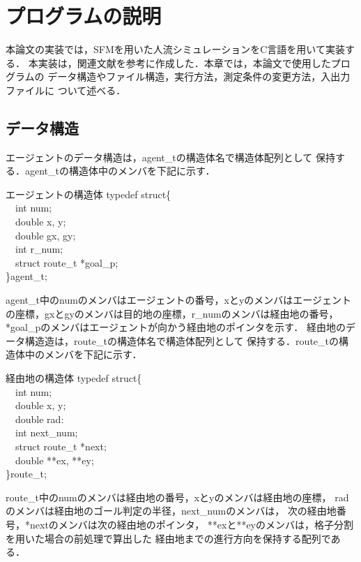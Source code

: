 \chapter{プログラムの説明}
\label{sec:appendix}
本論文の実装では，SFMを用いた人流シミュレーションをC言語を用いて実装する．
本実装は，関連文献を参考に作成した．本章では，本論文で使用したプログラムの
データ構造やファイル構造，実行方法，測定条件の変更方法，入出力ファイルに
ついて述べる．

\section{データ構造}
エージェントのデータ構造は，agent\_tの構造体名で構造体配列として
保持する．agent\_tの構造体中のメンバを下記に示す．
%
\begin{itembox}[l]{エージェントの構造体}
typedef struct\{\\
　int num;\\
　double x, y;\\
　double gx, gy;\\
　int r\_num;\\
　struct route\_t *goal\_p;\\
\}agent\_t;
\end{itembox}
%
agent\_t中のnumのメンバはエージェントの番号，xとyのメンバはエージェント
の座標，gxとgyのメンバは目的地の座標，r\_numのメンバは経由地の番号，
*goal\_pのメンバはエージェントが向かう経由地のポインタを示す．
経由地のデータ構造造は，route\_tの構造体名で構造体配列として
保持する．route\_tの構造体中のメンバを下記に示す．
%
\begin{itembox}[l]{経由地の構造体}
typedef struct\{\\
　int num;\\
　double x, y;\\
　double rad:\\
　int next\_num;\\
　struct route\_t *next;\\
　double **ex, **ey;\\
\}route\_t;
\end{itembox}
%
route\_t中のnumのメンバは経由地の番号，xとyのメンバは経由地の座標，
radのメンバは経由地のゴール判定の半径，next\_numのメンバは，
次の経由地番号，*nextのメンバは次の経由地のポインタ，
**exと**eyのメンバは，格子分割を用いた場合の前処理で算出した
経由地までの進行方向を保持する配列である．

